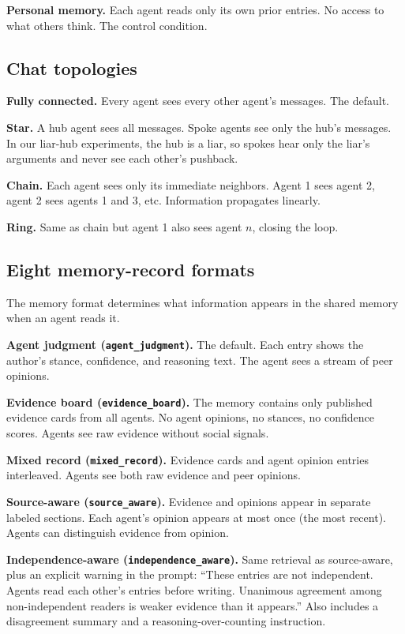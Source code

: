 \textbf{Personal memory.} Each agent reads only its own prior entries. No access to what others think. The control condition.

\subsection{Chat topologies}

\textbf{Fully connected.} Every agent sees every other agent's messages. The default.

\textbf{Star.} A hub agent sees all messages. Spoke agents see only the hub's messages. In our liar-hub experiments, the hub is a liar, so spokes hear only the liar's arguments and never see each other's pushback.

\textbf{Chain.} Each agent sees only its immediate neighbors. Agent 1 sees agent 2, agent 2 sees agents 1 and 3, etc. Information propagates linearly.

\textbf{Ring.} Same as chain but agent 1 also sees agent $n$, closing the loop.

\subsection{Eight memory-record formats}

The memory format determines what information appears in the shared memory when an agent reads it.

\textbf{Agent judgment (\texttt{agent\_judgment}).} The default. Each entry shows the author's stance, confidence, and reasoning text. The agent sees a stream of peer opinions.

\textbf{Evidence board (\texttt{evidence\_board}).} The memory contains only published evidence cards from all agents. No agent opinions, no stances, no confidence scores. Agents see raw evidence without social signals.

\textbf{Mixed record (\texttt{mixed\_record}).} Evidence cards and agent opinion entries interleaved. Agents see both raw evidence and peer opinions.

\textbf{Source-aware (\texttt{source\_aware}).} Evidence and opinions appear in separate labeled sections. Each agent's opinion appears at most once (the most recent). Agents can distinguish evidence from opinion.

\textbf{Independence-aware (\texttt{independence\_aware}).} Same retrieval as source-aware, plus an explicit warning in the prompt: ``These entries are not independent. Agents read each other's entries before writing. Unanimous agreement among non-independent readers is weaker evidence than it appears.'' Also includes a disagreement summary and a reasoning-over-counting instruction.

